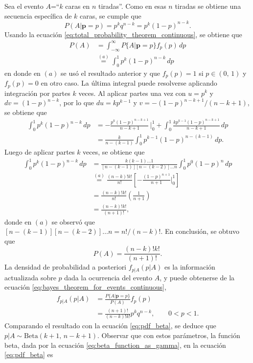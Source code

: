 \documentclass[a4paper]{report}
\newcommand{\p}{\mathbf{p}}
\begin{document}
Sea el evento \(A\)=``\(k\) caras en \(n\) tiradas''. Como en esas \(n\) tiradas se obtiene una secuencia específica de \(k\) caras, se cumple que
\[
 P(A|\p=p)=p^kq^{n-k}=p^k(1-p)^{n-k}.
\]
Usando la ecuación \ref{eq:total_probability_theorem_continuous}, se obtiene que
\begin{align*}
 P(A) &= \int_{-\infty}^{\infty}P\{A|\p = p\}f_p(p)\,dp\\
      &\overset{(a)}{=} \int_{0}^{1}p^k(1-p)^{n-k}\,dp
\end{align*}
en donde en \((a)\) se usó el resultado anterior y que \(f_p(p)=1\) si \(p\in(0,\,1)\) y \(f_p(p)=0\) en otro caso. La última integral puede resolverse aplicando integración por partes \(k\) veces. Al aplicar partes una vez con \(u=p^k\) y \(dv=(1-p)^{n-k}\), por lo que \(du=kp^{k-1}\) y \(v=-(1-p)^{n-k+1}/(n-k+1)\), se obtiene que
\begin{align*}
 \int_{0}^{1}p^k(1-p)^{n-k}\,dp&=-\frac{p^{k}(1-p)^{n-k+1}}{n-k+1}\,\bigg|_{0}^{1} + \int_{0}^{1}\frac{kp^{k-1}(1-p)^{n-k+1}}{n-k+1}\,dp\\
 &=\frac{k}{n-(k-1)}\int_{0}^{1}p^{k-1}(1-p)^{n-(k-1)}\,dp.
\end{align*}
Luego de aplicar partes \(k\) veces, se obtiene que
\begin{align*}
 \int_{0}^{1}p^k(1-p)^{n-k}\,dp&=\frac{k(k-1)\dots 1}{[n-(k-1)][n-(k-2)]\dots n} \int_{0}^{1}p^0(1-p)^{n}\,dp\\
  &\overset{(a)}{=}\frac{(n-k)!k!}{n!}\left[-\frac{(1-p)^{n+1}}{n+1}\bigg|_{0}^{1}\right]\\
  &=\frac{(n-k)!k!}{n!}\left(\frac{1}{n+1}\right)\\
  &=\frac{(n-k)!k!}{(n+1)!},
\end{align*}
donde en \((a)\) se observó que \([n-(k-1)][n-(k-2)]\dots n=n!/(n-k)!\). En conclusión, se obtuvo que
\[
 P(A)=\frac{(n-k)!k!}{(n+1)!}.
\]
La densidad de probabilidad a posteriori \(f_{p|A}(p|A)\) es la información actualizada sobre \(p\) dada la ocurrencia del evento \(A\), y puede obtenerse de la ecuación \ref{eq:bayes_theorem_for_events_continuous},
\begin{align}\label{eq:example_4_19_posterior_probability}
 f_{p|A}(p|A)&=\frac{P\{A|\p = p\}}{P(A)}f_p(p)\nonumber\\
   &=\frac{(n+1)!}{(n-k)!k!}p^kq^{n-k},\qquad 0<p<1.
\end{align}
Comparando el resultado con la ecuación \ref{eq:pdf_beta}, se deduce que \(p|A\sim\mathrm{Beta}(k+1,\,n-k+1)\). Observar que con estos parámetros, la función beta, dada por la ecuación \ref{eq:beta_function_as_gamma}, en la ecuación \ref{eq:pdf_beta} es 
\end{document}
